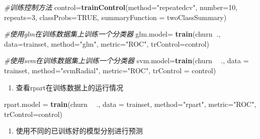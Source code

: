 \documentclass[
]{article}
\newenvironment{Shaded}{\begin{snugshade}}{\end{snugshade}}
\newcommand{\CommentTok}[1]{\textcolor[rgb]{0.56,0.35,0.01}{\textit{#1}}}
\newcommand{\DataTypeTok}[1]{\textcolor[rgb]{0.13,0.29,0.53}{#1}}
\newcommand{\DecValTok}[1]{\textcolor[rgb]{0.00,0.00,0.81}{#1}}
\newcommand{\KeywordTok}[1]{\textcolor[rgb]{0.13,0.29,0.53}{\textbf{#1}}}
\newcommand{\NormalTok}[1]{#1}
\newcommand{\OperatorTok}[1]{\textcolor[rgb]{0.81,0.36,0.00}{\textbf{#1}}}
\newcommand{\OtherTok}[1]{\textcolor[rgb]{0.56,0.35,0.01}{#1}}
\newcommand{\StringTok}[1]{\textcolor[rgb]{0.31,0.60,0.02}{#1}}
\providecommand{\tightlist}{%
  \setlength{\itemsep}{0pt}\setlength{\parskip}{0pt}}
\begin{document}
\begin{Shaded}
\begin{Highlighting}[]
\CommentTok{#训练控制方法}
\NormalTok{control=}\KeywordTok{trainControl}\NormalTok{(}\DataTypeTok{method=}\StringTok{"repeatedcv"}\NormalTok{,}
                     \DataTypeTok{number=}\DecValTok{10}\NormalTok{,}
                     \DataTypeTok{repeats=}\DecValTok{3}\NormalTok{,}
                     \DataTypeTok{classProbs=}\OtherTok{TRUE}\NormalTok{,}
                     \DataTypeTok{summaryFunction =}\NormalTok{ twoClassSummary)}

\CommentTok{#使用glm在训练数据集上训练一个分类器}
\NormalTok{glm.model=}\StringTok{ }\KeywordTok{train}\NormalTok{(churn}\OperatorTok{~}\NormalTok{.,}
                 \DataTypeTok{data=}\NormalTok{trainset,}
                 \DataTypeTok{method=}\StringTok{"glm"}\NormalTok{,}
                 \DataTypeTok{metric=}\StringTok{"ROC"}\NormalTok{,}
                 \DataTypeTok{trControl=}\NormalTok{control)}

\CommentTok{#使用svm在训练数据集上训练一个分类器}
\NormalTok{svm.model=}\KeywordTok{train}\NormalTok{(churn }\OperatorTok{~}\StringTok{ }\NormalTok{.,}
                \DataTypeTok{data =}\NormalTok{ trainset,}
                \DataTypeTok{method=}\StringTok{"svmRadial"}\NormalTok{,}
                \DataTypeTok{metric=}\StringTok{"ROC"}\NormalTok{,}
                \DataTypeTok{trControl =}\NormalTok{ control)}
\end{Highlighting}
\end{Shaded}

\begin{enumerate}
\def\labelenumi{\arabic{enumi}.}
\setcounter{enumi}{4}
\tightlist
\item
  查看rpart在训练数据上的运行情况
\end{enumerate}

\begin{Shaded}
\begin{Highlighting}[]
\NormalTok{rpart.model =}\StringTok{ }\KeywordTok{train}\NormalTok{(churn }\OperatorTok{~}\StringTok{ }\NormalTok{.,}
                    \DataTypeTok{data =}\NormalTok{ trainset,}
                    \DataTypeTok{method=}\StringTok{"rpart"}\NormalTok{,}
                    \DataTypeTok{metric=}\StringTok{"ROC"}\NormalTok{,}
                    \DataTypeTok{trControl=}\NormalTok{control)}
\end{Highlighting}
\end{Shaded}

\begin{enumerate}
\def\labelenumi{\arabic{enumi}.}
\setcounter{enumi}{5}
\tightlist
\item
  使用不同的已训练好的模型分别进行预测
\end{enumerate}
\end{document}

